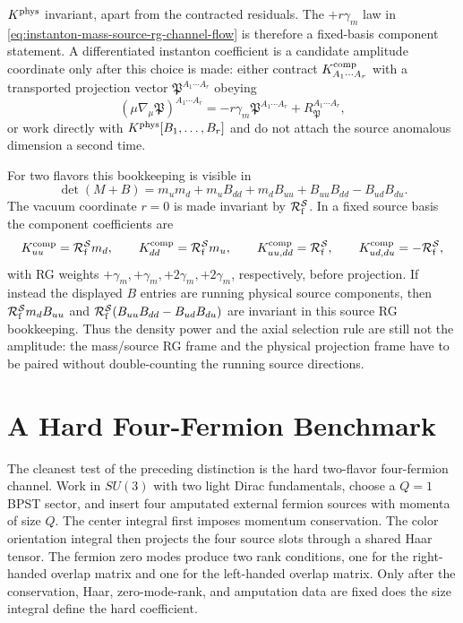 \begin{construction}
\(K^{\rm phys}\) invariant, apart from the contracted residuals.  The
\(+r\gamma_m\) law in
\eqref{eq:instanton-mass-source-rg-channel-flow} is therefore a fixed-basis
component statement.  A differentiated instanton coefficient is a candidate
amplitude coordinate only after this choice is made: either contract
\(K^{\rm comp}_{A_1\cdots A_r}\) with a transported projection vector
\(\mathfrak P^{A_1\cdots A_r}\) obeying
\[
  (\mu\nabla_\mu\mathfrak P)^{A_1\cdots A_r}
  =
  -r\gamma_m\mathfrak P^{A_1\cdots A_r}
  +R_{\mathfrak P}^{A_1\cdots A_r},
\]
or work directly with \(K^{\rm phys}[B_1,\ldots,B_r]\) and do not attach the
source anomalous dimension a second time.

For two flavors this bookkeeping is visible in
\[
  \det(M+B)
  =
  m_um_d+m_uB_{dd}+m_dB_{uu}+B_{uu}B_{dd}-B_{ud}B_{du}.
\]
The vacuum coordinate \(r=0\) is made invariant by
\(\mathcal R_{\rm f}^{\mathcal S}\).  In a fixed source basis the component
coefficients are
\[
  K^{\rm comp}_{uu}=\mathcal R_{\rm f}^{\mathcal S}m_d,\qquad
  K^{\rm comp}_{dd}=\mathcal R_{\rm f}^{\mathcal S}m_u,\qquad
  K^{\rm comp}_{uu,dd}=\mathcal R_{\rm f}^{\mathcal S},\qquad
  K^{\rm comp}_{ud,du}=-\mathcal R_{\rm f}^{\mathcal S},
\]
with RG weights \(+\gamma_m,+\gamma_m,+2\gamma_m,+2\gamma_m\),
respectively, before projection.  If instead the displayed \(B\) entries are
running physical source components, then
\(\mathcal R_{\rm f}^{\mathcal S}m_dB_{uu}\) and
\(\mathcal R_{\rm f}^{\mathcal S}(B_{uu}B_{dd}-B_{ud}B_{du})\) are invariant
in this source RG bookkeeping.  Thus the density power and the axial
selection rule are still not the amplitude: the mass/source RG frame and the
physical projection frame have to be paired without double-counting the
running source directions.
\end{construction}

\section{A Hard Four-Fermion Benchmark}
\label{sec:instanton-hard-four-fermion-benchmark}

The cleanest test of the preceding distinction is the hard two-flavor
four-fermion channel.  Work in \(SU(3)\) with two light Dirac fundamentals,
choose a \(Q=1\) BPST sector, and insert four amputated external fermion
sources with momenta of size \(Q\).  The center integral first imposes
momentum conservation.  The color orientation integral then projects the
four source slots through a shared Haar tensor.  The fermion zero modes
produce two rank conditions, one for the right-handed overlap matrix and one
for the left-handed overlap matrix.  Only after the conservation, Haar,
zero-mode-rank, and amputation data are fixed does the size integral define
the hard coefficient.

